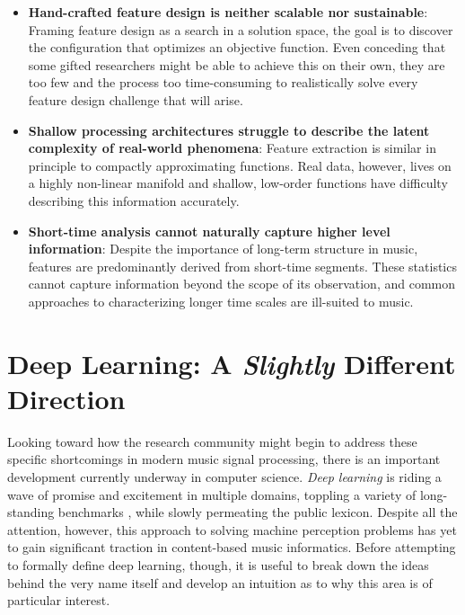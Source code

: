 \begin{itemize}

\item \textbf{Hand-crafted feature design is neither scalable nor sustainable}: Framing feature design as a search in a solution space, the goal is to discover the configuration that optimizes an objective function. Even conceding that some gifted researchers might be able to achieve this on their own, they are too few and the process too time-consuming to realistically solve every feature design challenge that will arise. \\
\item \textbf{Shallow processing architectures struggle to describe the latent complexity of real-world phenomena}: Feature extraction is similar in principle to compactly approximating functions. Real data, however, lives on a highly non-linear manifold and shallow, low-order functions have difficulty describing this information accurately. \\
\item \textbf{Short-time analysis cannot naturally capture higher level information}: Despite the importance of long-term structure in music, features are predominantly derived from short-time segments. These statistics cannot capture information beyond the scope of its observation, and common approaches to characterizing longer time scales are ill-suited to music.\\

\end{itemize}

\section{Deep Learning: A \emph{Slightly} Different Direction}
\label{sec:deep_learning}

Looking toward how the research community might begin to address these specific shortcomings in modern music signal processing, there is an important development currently underway in computer science.
\emph{Deep learning} is riding a wave of promise and excitement in multiple domains, toppling a variety of long-standing benchmarks \cite{Krizhevsky2012Imagenet,Hinton2012Deep}, while slowly permeating the public lexicon\cite{Brumfiel2014Deep,Markoff2012Scientists}.
Despite all the attention, however, this approach to solving machine perception problems has yet to gain significant traction in content-based music informatics.
Before attempting to formally define deep learning, though, it is useful to break down the ideas behind the very name itself and develop an intuition as to why this area is of particular interest.


